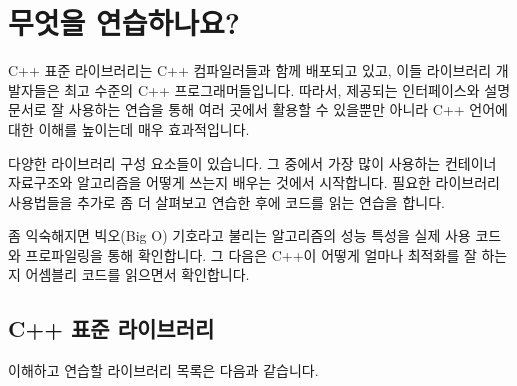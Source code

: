 \chapter{무엇을 연습하나요?}

C++ 표준 라이브러리는 C++ 컴파일러들과 함께 배포되고 있고, 이들 라이브러리 개발자들은 
최고 수준의 C++ 프로그래머들입니다. 따라서, 제공되는 인터페이스와 설명 문서로 잘 
사용하는 연습을 통해 여러 곳에서 활용할 수 있을뿐만 아니라 C++ 언어에 대한 이해를 
높이는데 매우 효과적입니다. 

다양한 라이브러리 구성 요소들이 있습니다. 그 중에서 가장 많이 사용하는 컨테이너 자료구조와 
알고리즘을 어떻게 쓰는지 배우는 것에서 시작합니다. 필요한 라이브러리 사용법들을 추가로 
좀 더 살펴보고 연습한 후에 코드를 읽는 연습을 합니다. 

좀 익숙해지면 빅오(Big O) 기호라고 불리는 알고리즘의 성능 특성을 실제 사용 코드와 
프로파일링을 통해 확인합니다. 그 다음은 C++이 어떻게 얼마나 최적화를 잘 하는지 
어셈블리 코드를 읽으면서 확인합니다. 

\section{C++ 표준 라이브러리}

이해하고 연습할 라이브러리 목록은 다음과 같습니다. 

